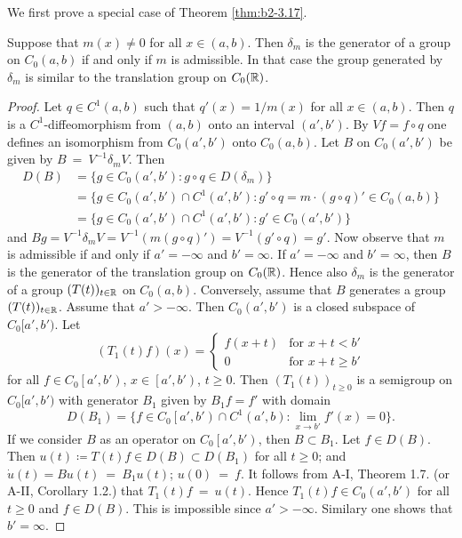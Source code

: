 We first prove a special case of Theorem \ref{thm:b2-3.17}.
\begin{proposition}\label{prop:b2-3.18}
%
Suppose that $m(x) \neq 0$ for all $x \in (a,b)$.
Then $\delta_{m}$ is the generator of a group on $C_{0}(a,b)$ if and only if $m$ is admissible.
In that case the group generated by $\delta_{m}$ is similar to the translation group on $C_{0}(\mathbb{R})$.
\end{proposition}
\begin{proof}
Let $q \in C^{1}(a,b)$ such that $q'(x) = 1/m(x)$ for all $x \in (a,b)$.
Then $q$ is a $C^{1}$-diffeomorphism from $(a,b)$ onto an interval $(a',b')$.
By $Vf = f \circ q$ one defines an isomorphism from $C_{0}(a',b')$ onto $C_{0}(a,b)$.
Let $B$ on $C_{0}(a',b')$ be given by $B~=~V^{-1}\delta_{m}V$.
Then 
\begin{align*}
D(B) &= \{ g \in C_{0}(a',b') \colon g \circ q \in D(\delta_{m}) \} \\
&= \{ g \in C_{0}(a',b') \cap C^{1}(a',b') \colon g' \circ q 
= m \cdot (g \circ q)' \in C_{0}(a,b) \} \\
&= \{ g \in C_{0}(a',b') \cap C^{1}(a',b') \colon g' \in C_{0}(a',b') \}
\end{align*}
and $Bg = V^{-1}\delta_{m}V = V^{-1}(m(g \circ q)') = V^{-1}(g' \circ q) = g'$.
Now observe that $m$ is admissible if and only if $a' = -\infty$ and $b' = \infty$.
If $a' = -\infty$ and $b' = \infty$, then $B$ is the generator of the translation group on $C_{0}(\mathbb{R})$.
Hence also $\delta_{m}$ is the generator of a group $(T(t))_{t \in \mathbb{R}}$ on $C_{0}(a,b)$.
Conversely, assume that $B$ generates a group $(T(t))_{t \in \mathbb{R}}$.
Assume that $a' > -\infty$.
Then $C_{0}(a',b')$ is a closed subspace of $C_{0}[a',b')$.
Let
\begin{equation*}\label{eq:b2-t1}
(T_{1}(t)f)(x) = \begin{cases}
    f(x+t) & \text{for } x+t < b' \\
    0 & \text{for } x+t \geq b'
\end{cases}
\end{equation*}
for all $f \in C_{0}\left[a',b'\right)$, $x \in \left[a',b'\right)$, $t \geq 0$.
Then $(T_{1}(t))_{t \geq 0}$ is a semigroup on $C_{0}[a',b')$ with generator $B_{1}$ given by 
$B_{1}f = f'$ with domain 
\[
D(B_{1}) = \{ f \in C_{0}\left[a',b'\right) \cap C^{1}(a',b) \colon \lim_{x \to b'} f'(x) = 0 \}.
\]
If we consider $B$ as an operator on $C_{0}\left[a',b'\right)$, then $B \subset B_{1}$.
Let $f \in D(B)$.
Then $u(t) \coloneqq T(t)f \in D(B) \subset D(B_{1})$ for all $t \geq 0$; and $\dot{u}(t) = Bu(t)~=~B_{1}u(t)$; $u(0)~=~f$.
It follows from A-I, Theorem 1.7.  (or A-II, Corollary 1.2.)
that $T_{1}(t)f~=~u(t)$.
Hence $T_{1}(t)f \in C_{0}(a',b')$ for all $t \geq 0$ and $f \in D(B)$.
This is impossible since $a' > -\infty$.
Similary one shows that $b' = \infty$.
\end{proof}

